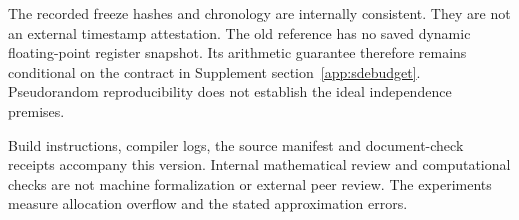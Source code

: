 The recorded freeze hashes and chronology are internally consistent. They are not an external timestamp attestation. The old reference has no saved dynamic floating-point register snapshot. Its arithmetic guarantee therefore remains conditional on the contract in Supplement section~\ref{app:sdebudget}. Pseudorandom reproducibility does not establish the ideal independence premises.

Build instructions, compiler logs, the source manifest and document-check receipts accompany this version. Internal mathematical review and computational checks are not machine formalization or external peer review. The experiments measure allocation overflow and the stated approximation errors.
